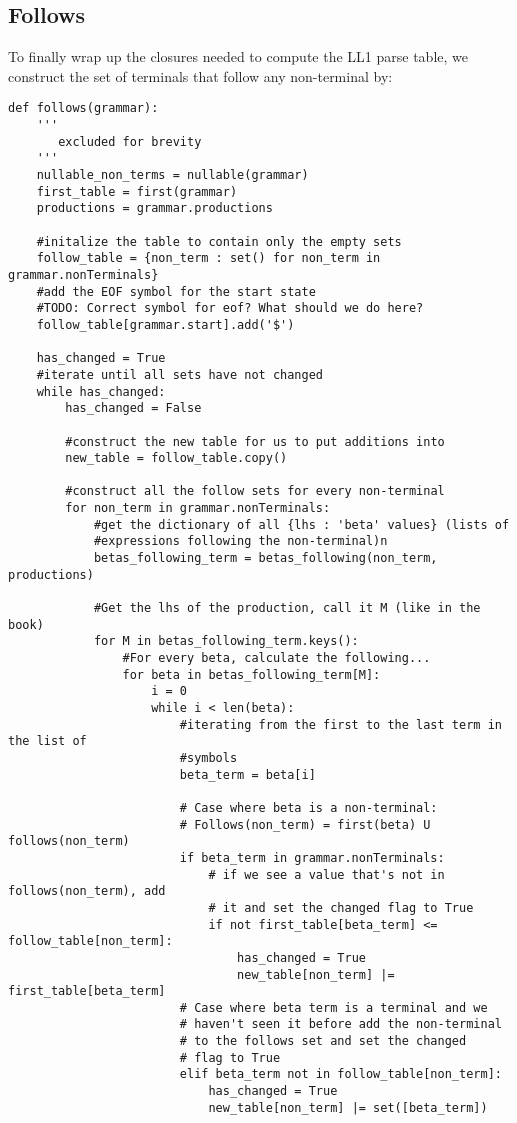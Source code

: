 \documentclass{article}
\begin{document}
\subsection{Follows}
To finally wrap up the closures needed to compute the LL1 parse table, we
construct the set of terminals that follow any non-terminal by:

\begin{verbatim}
def follows(grammar):
    '''
       excluded for brevity
    '''
    nullable_non_terms = nullable(grammar)
    first_table = first(grammar)
    productions = grammar.productions

    #initalize the table to contain only the empty sets
    follow_table = {non_term : set() for non_term in grammar.nonTerminals}
    #add the EOF symbol for the start state
    #TODO: Correct symbol for eof? What should we do here?
    follow_table[grammar.start].add('$')

    has_changed = True
    #iterate until all sets have not changed
    while has_changed:
        has_changed = False

        #construct the new table for us to put additions into 
        new_table = follow_table.copy()
        
        #construct all the follow sets for every non-terminal
        for non_term in grammar.nonTerminals:
            #get the dictionary of all {lhs : 'beta' values} (lists of
            #expressions following the non-terminal)n
            betas_following_term = betas_following(non_term, productions)
            
            #Get the lhs of the production, call it M (like in the book)
            for M in betas_following_term.keys():
                #For every beta, calculate the following...
                for beta in betas_following_term[M]:
                    i = 0
                    while i < len(beta):
                        #iterating from the first to the last term in the list of
                        #symbols 
                        beta_term = beta[i]

                        # Case where beta is a non-terminal:
                        # Follows(non_term) = first(beta) U follows(non_term)
                        if beta_term in grammar.nonTerminals:
                            # if we see a value that's not in follows(non_term), add
                            # it and set the changed flag to True
                            if not first_table[beta_term] <= follow_table[non_term]:
                                has_changed = True
                                new_table[non_term] |= first_table[beta_term]
                        # Case where beta term is a terminal and we
                        # haven't seen it before add the non-terminal
                        # to the follows set and set the changed
                        # flag to True
                        elif beta_term not in follow_table[non_term]:
                            has_changed = True
                            new_table[non_term] |= set([beta_term])


\end{verbatim}
\end{document}
